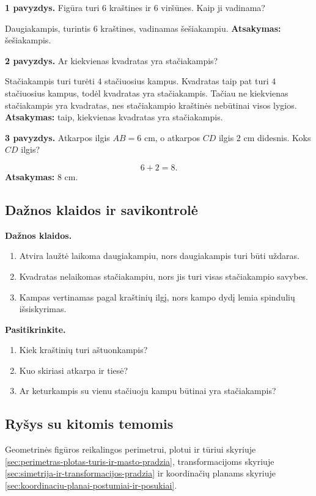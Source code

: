 \textbf{1 pavyzdys.} Figūra turi \(6\) kraštines ir \(6\) viršūnes. Kaip ji vadinama?

Daugiakampis, turintis \(6\) kraštines, vadinamas šešiakampiu.
\textbf{Atsakymas:} šešiakampis.

\textbf{2 pavyzdys.} Ar kiekvienas kvadratas yra stačiakampis?

Stačiakampis turi turėti \(4\) stačiuosius kampus. Kvadratas taip pat turi \(4\) stačiuosius kampus, todėl kvadratas yra stačiakampis. Tačiau ne kiekvienas stačiakampis yra kvadratas, nes stačiakampio kraštinės nebūtinai visos lygios.
\textbf{Atsakymas:} taip, kiekvienas kvadratas yra stačiakampis.

\textbf{3 pavyzdys.} Atkarpos ilgis \(AB=6\) cm, o atkarpos \(CD\) ilgis \(2\) cm didesnis. Koks \(CD\) ilgis?

\[
6+2=8.
\]
\textbf{Atsakymas:} \(8\) cm.

\subsection{Dažnos klaidos ir savikontrolė}

\textbf{Dažnos klaidos.}
\begin{enumerate}[label=\arabic*.]
\item Atvira laužtė laikoma daugiakampiu, nors daugiakampis turi būti uždaras.
\item Kvadratas nelaikomas stačiakampiu, nors jis turi visas stačiakampio savybes.
\item Kampas vertinamas pagal kraštinių ilgį, nors kampo dydį lemia spindulių išsiskyrimas.
\end{enumerate}

\textbf{Pasitikrinkite.}
\begin{enumerate}[label=\arabic*.]
\item Kiek kraštinių turi aštuonkampis?
\item Kuo skiriasi atkarpa ir tiesė?
\item Ar keturkampis su vienu stačiuoju kampu būtinai yra stačiakampis?
\end{enumerate}

\subsection{Ryšys su kitomis temomis}

Geometrinės figūros reikalingos perimetrui, plotui ir tūriui skyriuje \ref{sec:perimetras-plotas-turis-ir-masto-pradzia}, transformacijoms skyriuje \ref{sec:simetrija-ir-transformacijos-pradzia} ir koordinačių planams skyriuje \ref{sec:koordinaciu-planai-postumiai-ir-posukiai}.

